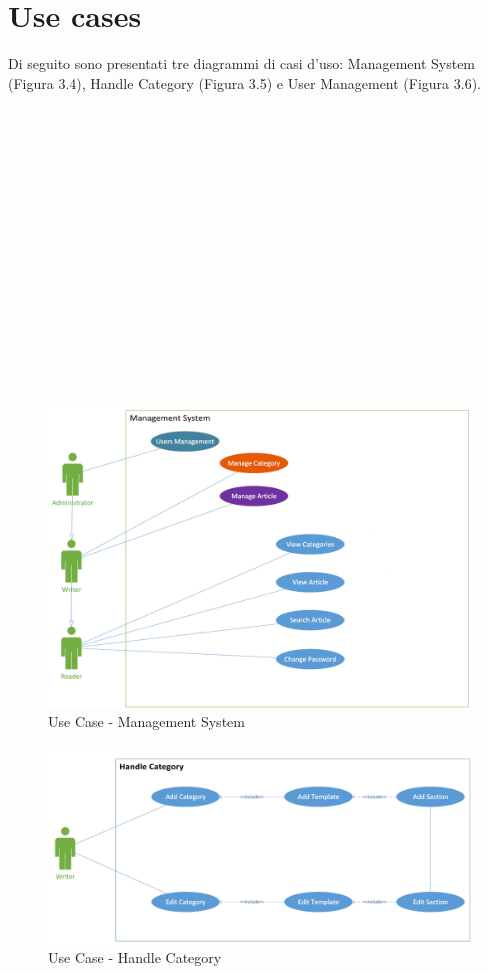 \documentclass[twoside]{supsistudent}
\begin{document}
\section{Use cases}
Di seguito sono presentati tre diagrammi di casi d'uso: Management System (Figura 3.4), Handle Category (Figura 3.5) e User Management (Figura 3.6).\\\\\\\\\\\\\\\\\\\\\\\\\\\\\\\\
\begin{figure}[!h]
\centering
\includegraphics[scale=0.3]{usecase_management.png}
\caption{Use Case - Management System}
\end{figure}
\begin{figure}[!h]
\centering
\includegraphics[scale=0.3]{usecase_writer.png}
\caption{Use Case - Handle Category}
\end{figure}
\end{document}
